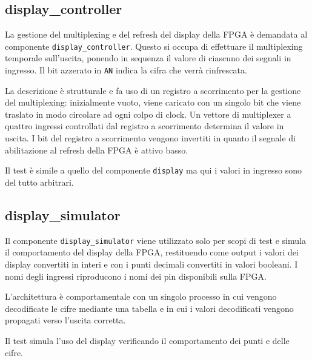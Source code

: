 \documentclass [11pt,a4paper,oneside]{article}
\newcommand{\component}[1]{\texttt{#1}}
\newcommand{\identifier}[1]{\texttt{#1}}
\begin{document}
\subsection{display\_controller}

La gestione del multiplexing e del refresh del display della FPGA
è demandata al componente \component{display\_controller}. Questo si occupa
di effettuare il multiplexing temporale sull'uscita, ponendo in
sequenza il valore di ciascuno dei segnali in ingresso. Il bit 
azzerato in \identifier{AN} indica la cifra che verrà rinfrescata.



La descrizione è strutturale e fa uso di un registro a scorrimento
per la gestione del multiplexing: inizialmente vuoto, viene caricato
con un singolo bit che viene traslato in modo circolare ad ogni colpo
di clock. Un vettore di multiplexer a quattro ingressi controllati
dal registro a scorrimento determina il valore in uscita. I bit
del registro a scorrimento vengono invertiti in quanto il segnale
di abilitazione al refresh della FPGA è attivo basso.



Il test è simile a quello del componente \component{display} ma qui i valori in
ingresso sono del tutto arbitrari.

\subsection{display\_simulator}

Il componente \component{display\_simulator} viene utilizzato solo per scopi di
test e simula il comportamento del display della FPGA, restituendo come
output i valori dei display convertiti in interi e con i punti decimali
convertiti in valori booleani. I nomi degli ingressi riproducono i nomi
dei pin disponibili sulla FPGA.



L'architettura è comportamentale con un singolo processo in cui vengono
decodificate le cifre mediante una tabella e in cui i valori decodificati
vengono propagati verso l'uscita corretta.



Il test simula l'uso del display verificando il comportamento dei punti e
delle cifre.
\end{document}

